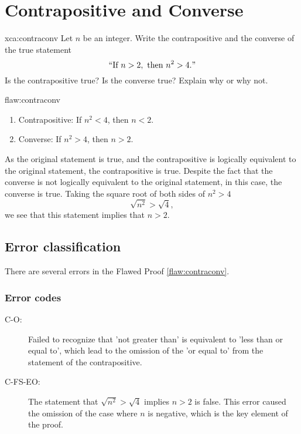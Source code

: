 \section{Contrapositive and Converse}

\begin{xca}[]{xca:contraconv}
Let $n$ be an integer.
Write the contrapositive and the converse of the true statement \\
$$``\text{If } n > 2, \text{ then } n^2 > 4."$$
Is the contrapositive true? Is the converse true? Explain why or why not. 
\end{xca}

\begin{flaw}{flaw:contraconv}
\begin{enumerate}
\item Contrapositive: If $n^2 < 4$, then $n < 2.$ 
\item Converse: If $n^2>4$, then $n>2$. \\
\end{enumerate}
As the original statement is true, and the contrapositive is logically equivalent to the original statement, the contrapositive is true. Despite the fact that the converse is not logically equivalent to the original statement, in this case, the converse is true. Taking the square root of both sides of $n^2>4$
$$\sqrt{n^2} > \sqrt{4},$$
we see that this statement implies that $n > 2.$
\end{flaw}

\clearpage
\subsection{Error classification}



There are several errors
 in the Flawed Proof \ref{flaw:contraconv}. 

 
\subsubsection{Error codes}

\begin{description}
 	\item[C-O:] Failed to recognize that 'not greater than' is equivalent to 'less than or equal to', which lead to the omission of the 'or equal to' from the statement of the contrapositive.
 	\item[C-FS-EO:] The statement that $\sqrt{n^2} > \sqrt{4}$ implies $n > 2$ is false. This error caused the omission of the case where $n$ is negative, which is the key element of the proof. 
 \end{description}

